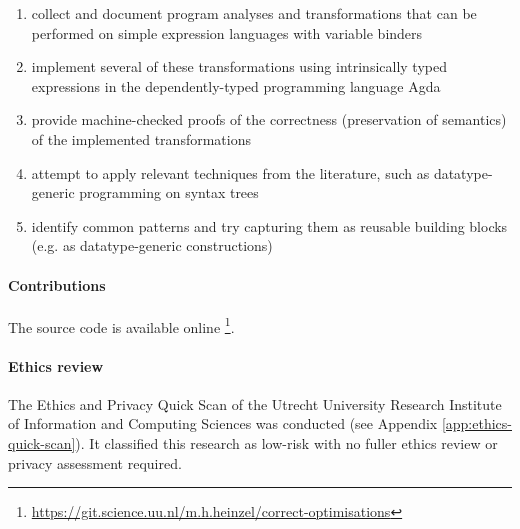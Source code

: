 {      \begin{enumerate}
        \item collect and document program analyses and transformations that can be performed on simple expression languages with variable binders
        \item implement several of these transformations using intrinsically typed expressions in the dependently-typed programming language Agda
        \item provide machine-checked proofs of the correctness (preservation of semantics) of the implemented transformations
        \item attempt to apply relevant techniques from the literature, such as datatype-generic programming on syntax trees
        \item identify common patterns and try capturing them as reusable building blocks (e.g. as datatype-generic constructions)
      \end{enumerate}
    }
  \paragraph{Contributions}
    The source code is available online%
    \footnote{\url{https://git.science.uu.nl/m.h.heinzel/correct-optimisations}}.
  \paragraph{Ethics review}
    The Ethics and Privacy Quick Scan of the Utrecht University Research Institute of Information and Computing Sciences was conducted (see Appendix \ref{app:ethics-quick-scan}).
    It classified this research as low-risk with no fuller ethics review or privacy assessment required.
